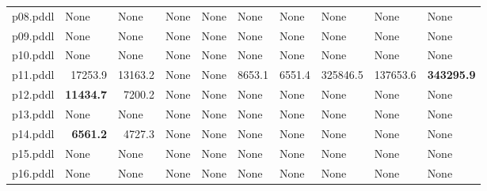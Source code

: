 \documentclass{article}
\begin{document}
\begin{tabular}{@{}lrrrrrrrrr@{}}
p08.pddl & \multicolumn{1}{|l|}{None} & \multicolumn{1}{|l|}{None} & \multicolumn{1}{|l|}{None} & \multicolumn{1}{|l|}{None} & \multicolumn{1}{|l|}{None} & \multicolumn{1}{|l|}{None} & \multicolumn{1}{|l|}{None} & \multicolumn{1}{|l|}{None} & \multicolumn{1}{|l|}{None} \\
p09.pddl & \multicolumn{1}{|l|}{None} & \multicolumn{1}{|l|}{None} & \multicolumn{1}{|l|}{None} & \multicolumn{1}{|l|}{None} & \multicolumn{1}{|l|}{None} & \multicolumn{1}{|l|}{None} & \multicolumn{1}{|l|}{None} & \multicolumn{1}{|l|}{None} & \multicolumn{1}{|l|}{None} \\
p10.pddl & \multicolumn{1}{|l|}{None} & \multicolumn{1}{|l|}{None} & \multicolumn{1}{|l|}{None} & \multicolumn{1}{|l|}{None} & \multicolumn{1}{|l|}{None} & \multicolumn{1}{|l|}{None} & \multicolumn{1}{|l|}{None} & \multicolumn{1}{|l|}{None} & \multicolumn{1}{|l|}{None} \\
p11.pddl & 17253.9 & 13163.2 & \multicolumn{1}{|l|}{None} & \multicolumn{1}{|l|}{None} & 8653.1 & 6551.4 & 325846.5 & 137653.6 & \textbf{343295.9} \\
p12.pddl & \textbf{11434.7} & 7200.2 & \multicolumn{1}{|l|}{None} & \multicolumn{1}{|l|}{None} & \multicolumn{1}{|l|}{None} & \multicolumn{1}{|l|}{None} & \multicolumn{1}{|l|}{None} & \multicolumn{1}{|l|}{None} & \multicolumn{1}{|l|}{None} \\
p13.pddl & \multicolumn{1}{|l|}{None} & \multicolumn{1}{|l|}{None} & \multicolumn{1}{|l|}{None} & \multicolumn{1}{|l|}{None} & \multicolumn{1}{|l|}{None} & \multicolumn{1}{|l|}{None} & \multicolumn{1}{|l|}{None} & \multicolumn{1}{|l|}{None} & \multicolumn{1}{|l|}{None} \\
p14.pddl & \textbf{6561.2} & 4727.3 & \multicolumn{1}{|l|}{None} & \multicolumn{1}{|l|}{None} & \multicolumn{1}{|l|}{None} & \multicolumn{1}{|l|}{None} & \multicolumn{1}{|l|}{None} & \multicolumn{1}{|l|}{None} & \multicolumn{1}{|l|}{None} \\
p15.pddl & \multicolumn{1}{|l|}{None} & \multicolumn{1}{|l|}{None} & \multicolumn{1}{|l|}{None} & \multicolumn{1}{|l|}{None} & \multicolumn{1}{|l|}{None} & \multicolumn{1}{|l|}{None} & \multicolumn{1}{|l|}{None} & \multicolumn{1}{|l|}{None} & \multicolumn{1}{|l|}{None} \\
p16.pddl & \multicolumn{1}{|l|}{None} & \multicolumn{1}{|l|}{None} & \multicolumn{1}{|l|}{None} & \multicolumn{1}{|l|}{None} & \multicolumn{1}{|l|}{None} & \multicolumn{1}{|l|}{None} & \multicolumn{1}{|l|}{None} & \multicolumn{1}{|l|}{None} & \multicolumn{1}{|l|}{None} \\

\end{tabular}
\end{document}
